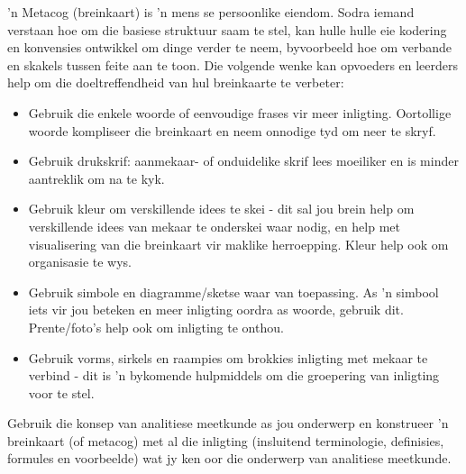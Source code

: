 ’n Metacog (breinkaart) is 'n mens se persoonlike eiendom. Sodra iemand verstaan hoe om die basiese struktuur saam te stel, kan hulle hulle eie kodering en konvensies ontwikkel om dinge verder te neem, byvoorbeeld hoe om verbande en skakels tussen feite aan te toon. Die volgende wenke kan opvoeders en leerders help om die doeltreffendheid van hul breinkaarte  te verbeter:

\begin{itemize}[noitemsep]
\item
Gebruik die enkele woorde of eenvoudige frases vir meer inligting. Oortollige woorde kompliseer die breinkaart en neem onnodige tyd om neer te skryf.
\item
Gebruik drukskrif: aanmekaar- of onduidelike skrif lees moeiliker en is minder aantreklik om na te kyk.
\item
 Gebruik kleur om verskillende idees te skei - dit sal jou brein help om verskillende idees van mekaar te onderskei waar nodig, en help met visualisering van die breinkaart vir maklike herroepping. Kleur help ook om organisasie te wys.
\item
Gebruik simbole en diagramme/sketse waar van toepassing. As 'n simbool iets vir jou beteken en meer inligting oordra as woorde, gebruik dit. Prente/foto's help ook om inligting te onthou.
\item
 Gebruik vorms, sirkels en raampies om brokkies inligting met mekaar te verbind - dit is 'n bykomende hulpmiddels om die groepering van inligting voor te stel.
\end{itemize}
Gebruik die konsep van analitiese meetkunde as jou onderwerp en konstrueer 'n breinkaart (of metacog) met al die inligting (insluitend terminologie, definisies, formules en voorbeelde) wat jy ken oor die onderwerp van analitiese meetkunde.

